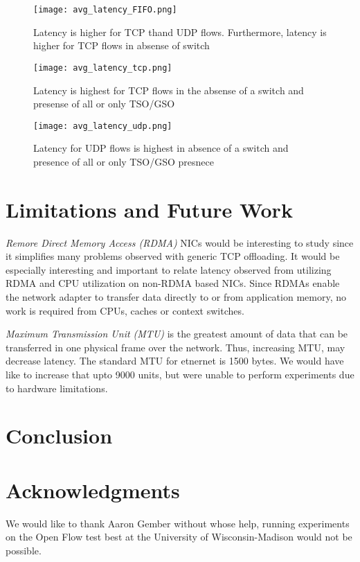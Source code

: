 \begin{figure}[t] 
\texttt{[image: avg\_latency\_FIFO.png]}
\caption{Latency is higher for TCP thand UDP flows. Furthermore, latency is
higher for TCP flows in absense of switch} 
\label{fig:avg_latency_FIFO}
\end{figure}


\begin{figure}[t] 
\texttt{[image: avg\_latency\_tcp.png]}
\caption{Latency is highest for TCP flows in the absense of a switch and
presense of all or only TSO/GSO} 
\label{fig:avg_latency_tcp}
\end{figure}


\begin{figure}[t] 
\texttt{[image: avg\_latency\_udp.png]}
\caption{Latency for UDP flows is highest in absence of a switch and presence of
all or only TSO/GSO presnece
} 
\label{fig:avg_latency_udp}
\end{figure}

\section{Limitations and Future Work}
\emph{Remore Direct Memory Access (RDMA)} NICs would be interesting to study since it 
simplifies many problems observed with generic TCP offloading. It would be
especially interesting and important to relate latency observed from utilizing
RDMA and CPU utilization on non-RDMA based NICs. Since RDMAs enable the network
adapter to transfer data directly to or from application memory, no work is
required from CPUs, caches or context switches.

\emph{Maximum Transmission Unit (MTU)} is the greatest amount of data that can be transferred in one physical frame over the network. Thus, increasing MTU, may decrease latency. The standard MTU for etnernet is 1500 bytes. We would have like to increase that upto 9000 units, but were unable to perform experiments due to hardware limitations.  

\section{Conclusion}

\section{Acknowledgments}

We would like to thank Aaron Gember without whose help, running experiments on
the Open Flow test best at the University of Wisconsin-Madison would not be
possible.  


